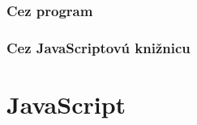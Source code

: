  \subsubsection{Cez program}
 
 \subsubsection{Cez JavaScriptovú knižnicu}















\section{JavaScript}











